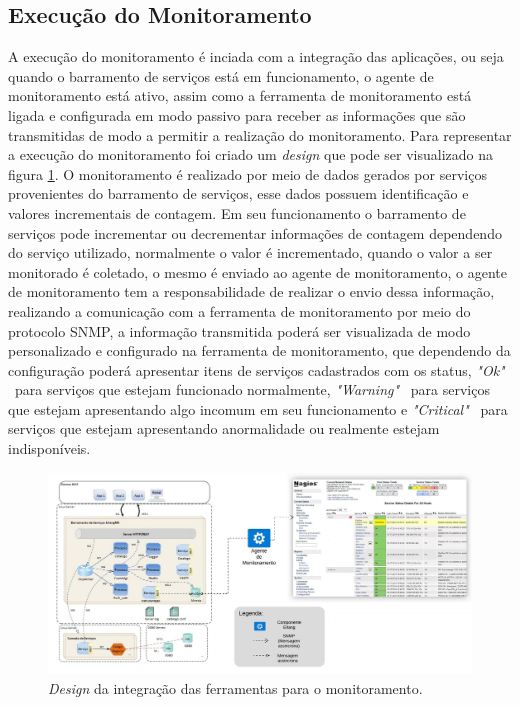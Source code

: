 {\subsection{Execução do Monitoramento}

A execução do monitoramento é inciada com a integração das aplicações, ou seja quando o barramento de serviços está em funcionamento, o agente de monitoramento está ativo, assim como a ferramenta de monitoramento está ligada e configurada em modo passivo para receber as informações que são transmitidas de modo a permitir a realização do monitoramento. Para representar a execução do monitoramento foi criado um \textit{design} que pode ser visualizado na figura \ref{fun:fig:arqtProjeto}. O monitoramento é realizado por meio de dados gerados por serviços provenientes do barramento de serviços, esse dados possuem identificação e valores incrementais de contagem. Em seu funcionamento o barramento de serviços pode incrementar ou decrementar informações de contagem dependendo do serviço utilizado, normalmente o valor é incrementado, quando o valor a ser monitorado é coletado, o mesmo é enviado ao agente de monitoramento, o agente de monitoramento tem a responsabilidade de realizar o envio dessa informação, realizando a comunicação com a ferramenta de monitoramento por meio do protocolo \acrshort{SNMP}, a informação transmitida poderá ser visualizada de modo personalizado e configurado na ferramenta de monitoramento, que dependendo da configuração poderá apresentar itens de serviços cadastrados com os status, \textit{"Ok"} \ para serviços que estejam funcionado normalmente, \textit{"Warning"} \  para serviços que estejam apresentando algo incomum em seu funcionamento e \textit{"Critical"} \ para serviços que estejam apresentando anormalidade ou realmente estejam indisponíveis.	 

\begin{figure}[h!]
	\begin{center}
	\includegraphics[scale = 0.45]{img/arqtProjeto.jpeg}
	\caption{\textit{Design} da integração das ferramentas para o monitoramento.}
	\label{fun:fig:arqtProjeto}
	\end{center}
\end{figure}



}
